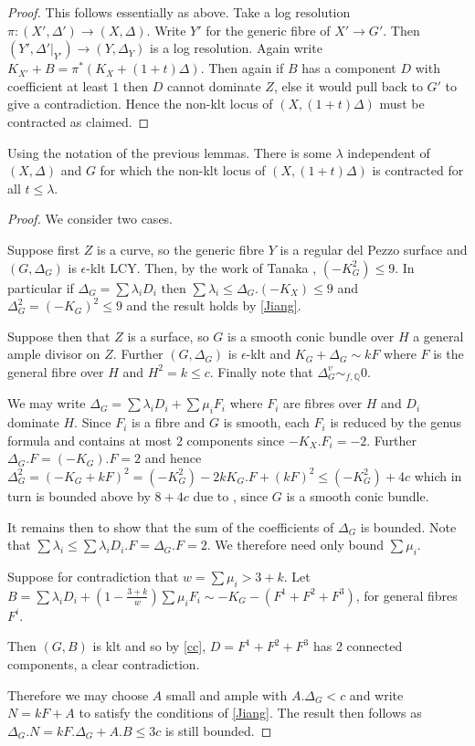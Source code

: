 \begin{proof}
	This follows essentially as above.
	Take a log resolution $\pi\colon (X',\Delta') \to (X,\Delta)$. Write $Y'$ for the generic fibre of $X' \to G'$. Then $(Y',\Delta'|_{Y'}) \to (Y,\Delta_{Y})$ is a log resolution. Again write $K_{X'}+B=\pi^{*}(K_{X}+(1+t)\Delta)$. Then again if $B$ has a component $D$ with coefficient at least $1$ then $D$ cannot dominate $Z$, else it would pull back to $G'$ to give a contradiction. Hence the non-klt locus of $(X,(1+t)\Delta)$ must be contracted as claimed. 
\end{proof}

\begin{lemma}
	Using the notation of the previous lemmas. There is some $\lambda$ independent of $(X,\Delta)$ and $G$ for which the non-klt locus of $(X,(1+t)\Delta)$ is contracted for all $t \leq \lambda$.
\end{lemma}
\begin{proof}
	We consider two cases. 
	
	Suppose first $Z$ is a curve, so the generic fibre $Y$ is a regular del Pezzo surface and $(G,\Delta_{G})$ is $\epsilon$-klt LCY. Then, by the work of Tanaka \cite[Corollary 4.8]{tanaka2019boundedness}, $(-K_{G}^{2}) \leq 9$. In particular if $\Delta_{G}=\sum \lambda_{i}D_{i}$ then $\sum \lambda_{i} \leq \Delta_{G}.(-K_{X}) \leq 9$ and $\Delta_{G}^{2} =(-K_{G})^{2} \leq 9$ and the result holds by \autoref{Jiang}. 
	
	Suppose then that $Z$ is a surface, so $G$ is a smooth conic bundle over $H$ a general ample divisor on $Z$. Further $(G,\Delta_{G})$ is $\epsilon$-klt and $K_{G}+\Delta_{G}\sim kF$ where $F$ is the general fibre over $H$ and $H^{2}=k \leq c$. Finally note that $\Delta_{G}^{v} \sim_{f,\mathbb{Q}} 0$.
	
	We may write $\Delta_{G}= \sum \lambda_{i}D_{i}+ \sum \mu_{i}F_{i}$ where $F_{i}$ are fibres over $H$ and $D_{i}$ dominate $H$. Since $F_{i}$ is a fibre and $G$ is smooth, each $F_{i}$ is reduced by the genus formula and contains at most $2$ components since $-K_{X}.F_{i}=-2$. Further $\Delta_{G}.F=(-K_{G}).F=2$ and hence $\Delta_{G}^{2}=(-K_{G}+kF)^{2}=(-K_{G}^{2})-2kK_{G}.F +(kF)^{2} \leq (-K_{G}^{2})+4c$ which in turn is bounded above by $8+4c$ due to \cite[Proposition III.21]{beauville1996complex}, since $G$ is a smooth conic bundle.
	
	It remains then to show that the sum of the coefficients of $\Delta_{G}$ is bounded. Note that $\sum \lambda_{i} \leq \sum \lambda_{i}D_{i}.F =\Delta_{G}.F =2$. We therefore need only bound $\sum \mu_{i}$.
	
	Suppose for contradiction that $w=\sum \mu_{i} >3 +k$. Let $B=\sum \lambda_{i}D_{i} +(1-\frac{3+k}{w})\sum \mu_{i}F_{i}  \sim -K_{G}-(F^{1}+F^{2}+F^{3})$, for general fibres $F^{i}$.
	
	Then $(G,B)$ is klt and so by \autoref{cc}, $D=F^{1}+F^{2}+F^{3}$ has 2 connected components, a clear contradiction.
	
	Therefore we may choose $A$ small and ample with $A.\Delta_{G} < c$ and write $N=kF+A$ to satisfy the conditions of \autoref{Jiang}. The result then follows as $\Delta_{G}.N=kF.\Delta_{G}+A.B\leq 3c$ is still bounded.
\end{proof}
